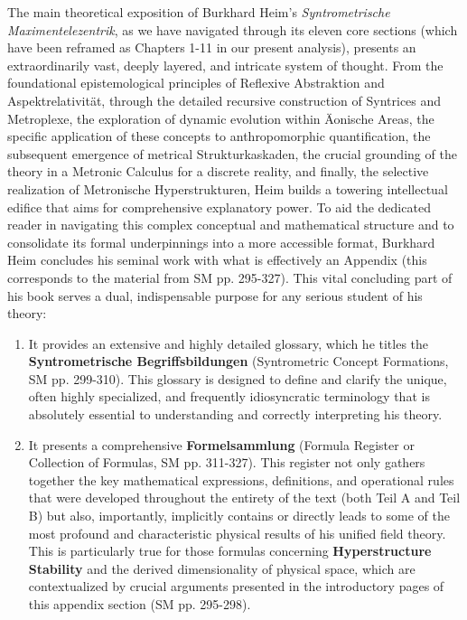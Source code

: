 \documentclass[12pt]{article}
\begin{document}
The main theoretical exposition of Burkhard Heim's \textit{Syntrometrische Maximentelezentrik}, as we have navigated through its eleven core sections (which have been reframed as Chapters 1-11 in our present analysis), presents an extraordinarily vast, deeply layered, and intricate system of thought. From the foundational epistemological principles of Reflexive Abstraktion and Aspektrelativität, through the detailed recursive construction of Syntrices and Metroplexe, the exploration of dynamic evolution within Äonische Areas, the specific application of these concepts to anthropomorphic quantification, the subsequent emergence of metrical Strukturkaskaden, the crucial grounding of the theory in a Metronic Calculus for a discrete reality, and finally, the selective realization of Metronische Hyperstrukturen, Heim builds a towering intellectual edifice that aims for comprehensive explanatory power. To aid the dedicated reader in navigating this complex conceptual and mathematical structure and to consolidate its formal underpinnings into a more accessible format, Burkhard Heim concludes his seminal work with what is effectively an Appendix (this corresponds to the material from SM pp. 295-327). This vital concluding part of his book serves a dual, indispensable purpose for any serious student of his theory:

\begin{enumerate}
    \item It provides an extensive and highly detailed glossary, which he titles the \textbf{Syntrometrische Begriffsbildungen} (Syntrometric Concept Formations, SM pp. 299-310). This glossary is designed to define and clarify the unique, often highly specialized, and frequently idiosyncratic terminology that is absolutely essential to understanding and correctly interpreting his theory.
    \item It presents a comprehensive \textbf{Formelsammlung} (Formula Register or Collection of Formulas, SM pp. 311-327). This register not only gathers together the key mathematical expressions, definitions, and operational rules that were developed throughout the entirety of the text (both Teil A and Teil B) but also, importantly, implicitly contains or directly leads to some of the most profound and characteristic physical results of his unified field theory. This is particularly true for those formulas concerning \textbf{Hyperstructure Stability} and the derived dimensionality of physical space, which are contextualized by crucial arguments presented in the introductory pages of this appendix section (SM pp. 295-298).
\end{enumerate}
\end{document}
